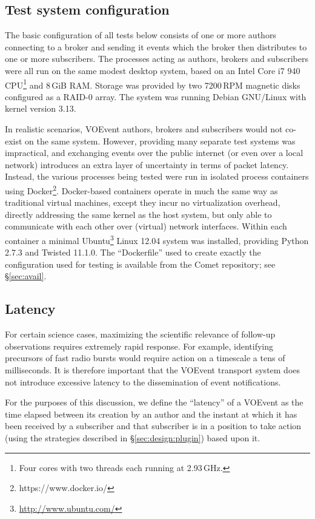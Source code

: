 \documentclass[5p,authoryear]{elsarticle}
\begin{document}
\subsection{Test system configuration}
\label{sec:perf:system}

The basic configuration of all tests below consists of one or more authors
connecting to a broker and sending it events which the broker then distributes
to one or more subscribers. The processes acting as authors, brokers and
subscribers were all run on the same modest desktop system, based on an Intel
Core i7 940 CPU\footnote{Four cores with two threads each running at
2.93\,GHz.}
and 8\,GiB RAM. Storage was provided by two 7200\,RPM magnetic disks
configured as a RAID-0 array. The system was running Debian GNU/Linux with kernel
version 3.13.

In realistic scenarios, VOEvent authors, brokers and subscribers would not
co-exist on the same system. However, providing many separate test systems was
impractical, and exchanging events over the public internet (or even over a
local network) introduces an extra layer of uncertainty in terms of packet
latency. Instead, the various processes being tested were run in isolated
process containers using Docker\footnote{https://www.docker.io/}. Docker-based
containers operate in much the same way as traditional virtual machines,
except they incur no virtualization overhead, directly addressing the same
kernel as the host system, but only able to communicate with each other over
(virtual) network interfaces.  Within each container a minimal
Ubuntu\footnote{\url{http://www.ubuntu.com/}} Linux 12.04 system was
installed, providing Python 2.7.3 and Twisted 11.1.0. The ``Dockerfile'' used
to create exactly the configuration used for testing is available from the
Comet repository; see \S\ref{sec:avail}.

\subsection{Latency}
\label{sec:perf:latency}

For certain science cases, maximizing the scientific relevance of follow-up
observations requires extremely rapid response. For example, identifying
precursors of fast radio bursts \citep{Thornton:2013} would require action on
a timescale a tens of milliseconds. It is therefore important that the VOEvent
transport system does not introduce excessive latency to the dissemination of
event notifications.

For the purposes of this discussion, we define the ``latency'' of a VOEvent as
the time elapsed between its creation by an author and the instant at which it
has been received by a subscriber and that subscriber is in a position to take
action (using the strategies described in \S\ref{sec:design:plugin}) based
upon it.
\end{document}

